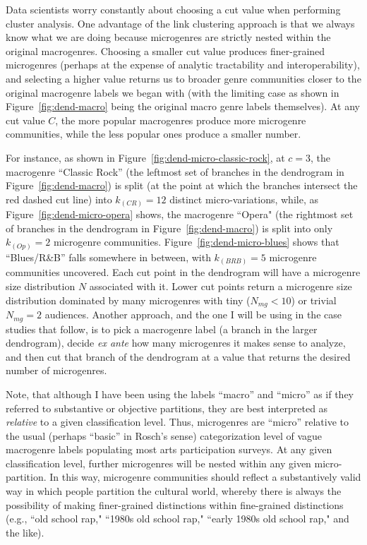 \documentclass[a4paper,12pt]{extarticle}
\begin{document}
Data scientists worry constantly about choosing a cut value when performing cluster analysis. One advantage of the link clustering approach is that we always know what we are doing because microgenres are strictly nested within the original macrogenres. Choosing a smaller cut value produces finer-grained microgenres (perhaps at the expense of analytic tractability and interoperability), and selecting a higher value returns us to broader genre communities closer to the original macrogenre labels we began with (with the limiting case as shown in Figure~\ref{fig:dend-macro} being the original macro genre labels themselves). At any cut value $C$, the more popular macrogenres produce more microgenre communities, while the less popular ones produce a smaller number. 

For instance, as shown in Figure~\ref{fig:dend-micro-classic-rock}, at $c = 3$, the macrogenre ``Classic Rock'' (the leftmost set of branches in the dendrogram in Figure~\ref{fig:dend-macro}) is split (at the point at which the branches intersect the red dashed cut line) into $k_{(CR)} = 12$ distinct micro-variations, while, as Figure~\ref{fig:dend-micro-opera} shows, the macrogenre ``Opera" (the rightmost set of branches in the dendrogram in Figure~\ref{fig:dend-macro}) is split into only $k_{(Op)} = 2$  microgenre communities. Figure~\ref{fig:dend-micro-blues} shows that ``Blues/R\&B'' falls somewhere in between, with $k_{(BRB)} = 5$  microgenre communities uncovered. Each cut point in the dendrogram will have a microgenre size distribution $N$ associated with it. Lower cut points return a microgenre size distribution dominated by many microgenres with tiny ($N_{mg} < 10$) or trivial $N_{mg} = 2$ audiences. Another approach, and the one I will be using in the case studies that follow, is to pick a macrogenre label (a branch in the larger dendrogram), decide \textit{ex ante} how many microgenres it makes sense to analyze, and then cut that branch of the dendrogram at a value that returns the desired number of microgenres.

Note, that although I have been using the labels ``macro'' and ``micro'' as if they referred to substantive or objective partitions, they are best interpreted as {\em relative} to a given classification level. Thus, microgenres are ``micro'' relative to the usual (perhaps ``basic'' in Rosch's \citeyearpar{Rosch1978-ue} sense) categorization level of vague macrogenre labels populating most arts participation surveys. At any given classification level, further microgenres will be nested within any given micro-partition. In this way, microgenre communities should reflect a substantively valid way in which people partition the cultural world, whereby there is always the possibility of making finer-grained distinctions within fine-grained distinctions (e.g., ``old school rap," ``1980s old school rap," ``early 1980s old school rap," and the like). 
 
\end{document}
